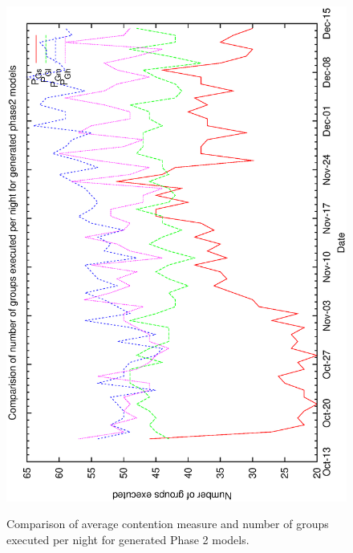\begin{figure}[h]
\begin{center}
{   \includegraphics[scale=0.5, angle=-90]{figures/c60_gen_ng.eps}  
   \label{fig:c60_gen_ng}
  }
  \caption{Comparison of average contention measure and number of groups executed per night for generated Phase 2 models.}
 \end{center}
\end{figure}

